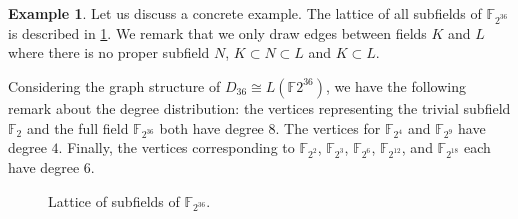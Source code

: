 \documentclass[11pt,a4paper]{amsart}
\theoremstyle{definition}
\newtheorem{expl}[thm]{Example}
\numberwithin{equation}{section}
\begin{document}
\begin{expl}
Let us discuss a concrete example. The lattice of all subfields of $\mathbb{F}_{2^{36}}$ is described in \cref{fig:subfield_lattice}. We remark that we only draw edges between fields $K$ and $L$ where there is no proper subfield $N$, $K \subset N \subset L$ and $K \subset L$. 

Considering the graph structure of $D_{36} \cong L(\mathbb{F}{2^{36}})$, we have the following remark about the degree distribution: the vertices representing the trivial subfield $\mathbb{F}_2$ and the full field $\mathbb{F}_{2^{36}}$ both have degree $8$.  The vertices for $\mathbb{F}_{2^4}$ and $\mathbb{F}_{2^{9}}$ have degree $4$. Finally, the vertices corresponding to $\mathbb{F}_{2^{2}}$, $\mathbb{F}_{2^{3}}$, $\mathbb{F}_{2^{6}}$, $\mathbb{F}_{2^{12}}$, and $\mathbb{F}_{2^{18}}$ each have degree $6$.
\begin{figure}
\label{tikz:fields}
\caption{Lattice of subfields of $\mathbb{F}_{2^{36}}$.}
\label{fig:subfield_lattice}  %
\end{figure}

\end{expl}
\bigskip
\end{document}
